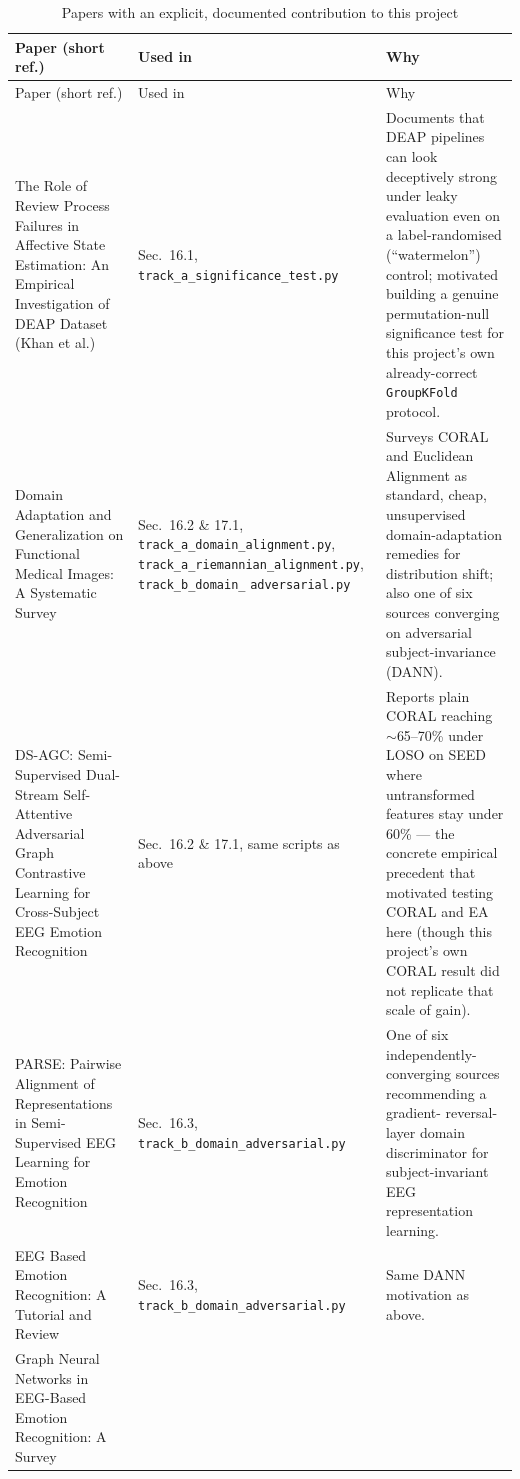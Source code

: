 \documentclass[11pt]{report}
\begin{document}
\begin{longtable}{p{4.7cm}p{4.3cm}p{5.5cm}}
\caption{Papers with an explicit, documented contribution to this project}
\label{tab:papers-cited} \\
\toprule
Paper (short ref.) & Used in & Why \\
\midrule
\endfirsthead
\toprule
Paper (short ref.) & Used in & Why \\
\midrule
\endhead
The Role of Review Process Failures in Affective State Estimation: An
Empirical Investigation of DEAP Dataset (Khan et al.) &
Sec.\ 16.1, \texttt{track\_a\_significance\_test.py} &
Documents that DEAP pipelines can look deceptively strong under leaky
evaluation even on a label-randomised (``watermelon'') control; motivated
building a genuine permutation-null significance test for this project's
own already-correct \texttt{GroupKFold} protocol. \\
\addlinespace
Domain Adaptation and Generalization on Functional Medical Images: A
Systematic Survey &
Sec.\ 16.2 \& 17.1, \texttt{track\_a\_domain\_alignment.py},
\texttt{track\_a\_riemannian\_alignment.py}, \texttt{track\_b\_domain\_}\linebreak
\texttt{adversarial.py} &
Surveys CORAL and Euclidean Alignment as standard, cheap, unsupervised
domain-adaptation remedies for distribution shift; also one of six sources
converging on adversarial subject-invariance (DANN). \\
\addlinespace
DS-AGC: Semi-Supervised Dual-Stream Self-Attentive Adversarial Graph
Contrastive Learning for Cross-Subject EEG Emotion Recognition &
Sec.\ 16.2 \& 17.1, same scripts as above &
Reports plain CORAL reaching $\sim$65--70\% under LOSO on SEED where
untransformed features stay under 60\% --- the concrete empirical precedent
that motivated testing CORAL and EA here (though this project's own CORAL
result did not replicate that scale of gain). \\
\addlinespace
PARSE: Pairwise Alignment of Representations in Semi-Supervised EEG Learning
for Emotion Recognition &
Sec.\ 16.3, \texttt{track\_b\_domain\_adversarial.py} &
One of six independently-converging sources recommending a gradient-
reversal-layer domain discriminator for subject-invariant EEG
representation learning. \\
\addlinespace
EEG Based Emotion Recognition: A Tutorial and Review &
Sec.\ 16.3, \texttt{track\_b\_domain\_adversarial.py} &
Same DANN motivation as above. \\
\addlinespace
Graph Neural Networks in EEG-Based Emotion Recognition: A Survey &

\end{longtable}
\end{document}
